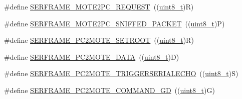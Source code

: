 \begin{DoxyCompactItemize}
\item 
\#define \hyperlink{group___open_serial_ga6fb55c17171dff6095228fa68069cd3e}{S\+E\+R\+F\+R\+A\+M\+E\+\_\+\+M\+O\+T\+E2\+P\+C\+\_\+\+R\+E\+Q\+U\+E\+ST}~((\hyperlink{_p_e___types_8h_aba7bc1797add20fe3efdf37ced1182c5}{uint8\+\_\+t})\textquotesingle{}R\textquotesingle{})
\item 
\#define \hyperlink{group___open_serial_ga6328feb8d4acbadd3c403522913ec6eb}{S\+E\+R\+F\+R\+A\+M\+E\+\_\+\+M\+O\+T\+E2\+P\+C\+\_\+\+S\+N\+I\+F\+F\+E\+D\+\_\+\+P\+A\+C\+K\+ET}~((\hyperlink{_p_e___types_8h_aba7bc1797add20fe3efdf37ced1182c5}{uint8\+\_\+t})\textquotesingle{}P\textquotesingle{})
\item 
\#define \hyperlink{group___open_serial_ga7d84c0666330f26f95d55f1747341b2a}{S\+E\+R\+F\+R\+A\+M\+E\+\_\+\+P\+C2\+M\+O\+T\+E\+\_\+\+S\+E\+T\+R\+O\+OT}~((\hyperlink{_p_e___types_8h_aba7bc1797add20fe3efdf37ced1182c5}{uint8\+\_\+t})\textquotesingle{}R\textquotesingle{})
\item 
\#define \hyperlink{group___open_serial_gafb648c9374f163a0fe504d132c2812bb}{S\+E\+R\+F\+R\+A\+M\+E\+\_\+\+P\+C2\+M\+O\+T\+E\+\_\+\+D\+A\+TA}~((\hyperlink{_p_e___types_8h_aba7bc1797add20fe3efdf37ced1182c5}{uint8\+\_\+t})\textquotesingle{}D\textquotesingle{})
\item 
\#define \hyperlink{group___open_serial_gac193711d797092c2e35f2ca3e7947b79}{S\+E\+R\+F\+R\+A\+M\+E\+\_\+\+P\+C2\+M\+O\+T\+E\+\_\+\+T\+R\+I\+G\+G\+E\+R\+S\+E\+R\+I\+A\+L\+E\+C\+HO}~((\hyperlink{_p_e___types_8h_aba7bc1797add20fe3efdf37ced1182c5}{uint8\+\_\+t})\textquotesingle{}S\textquotesingle{})
\item 
\#define \hyperlink{group___open_serial_ga2a7e44f17590c4c5562bc8df8b8240cc}{S\+E\+R\+F\+R\+A\+M\+E\+\_\+\+P\+C2\+M\+O\+T\+E\+\_\+\+C\+O\+M\+M\+A\+N\+D\+\_\+\+GD}~((\hyperlink{_p_e___types_8h_aba7bc1797add20fe3efdf37ced1182c5}{uint8\+\_\+t})\textquotesingle{}G\textquotesingle{})
\end{DoxyCompactItemize}
